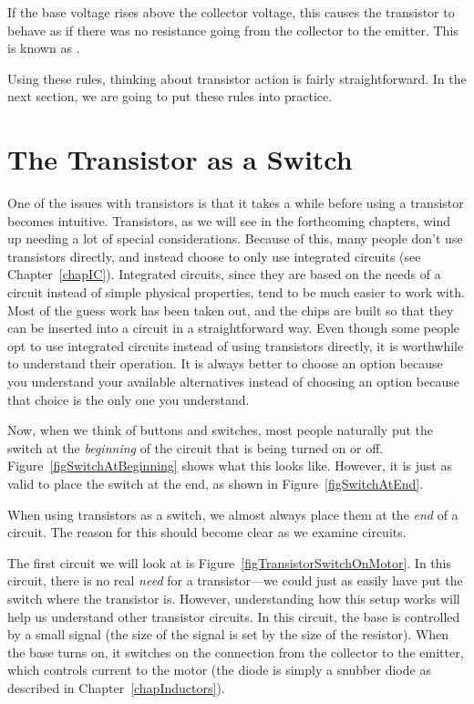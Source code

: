 If the base voltage rises above the collector voltage, this causes the transistor to behave as if there was no resistance going from the collector to the emitter.
This is known as .

Using these rules, thinking about transistor action is fairly straightforward.
In the next section, we are going to put these rules into practice.

\section{The Transistor as a Switch}

One of the issues with transistors is that it takes a while before using a transistor becomes intuitive.
Transistors, as we will see in the forthcoming chapters, wind up needing a lot of special considerations.
Because of this, many people don't use transistors directly, and instead choose to only use integrated circuits (see Chapter~\ref{chapIC}).
Integrated circuits, since they are based on the needs of a circuit instead of simple physical properties, tend to be much easier to work with.
Most of the guess work has been taken out, and the chips are built so that they can be inserted into a circuit in a straightforward way.
Even though some people opt to use integrated circuits instead of using transistors directly, it is worthwhile to understand their operation.
It is always better to choose an option because you understand your available alternatives instead of choosing an option because that choice is the only one you understand.

Now, when we think of buttons and switches, most people naturally put the switch at the \emph{beginning} of the circuit that is being turned on or off.
Figure~\ref{figSwitchAtBeginning} shows what this looks like.
However, it is just as valid to place the switch at the end, as shown in Figure~\ref{figSwitchAtEnd}.


When using transistors as a switch, we almost always place them at the \emph{end} of a circuit.
The reason for this should become clear as we examine circuits.

The first circuit we will look at is Figure~\ref{figTransistorSwitchOnMotor}.
In this circuit, there is no real \emph{need} for a transistor---we could just as easily have put the switch where the transistor is.
However, understanding how this setup works will help us understand other transistor circuits.
In this circuit, the base is controlled by a small signal (the size of the signal is set by the size of the resistor).
When the base turns on, it switches on the connection from the collector to the emitter, which controls current to the motor (the diode is simply a snubber diode as described in Chapter~\ref{chapInductors}).

